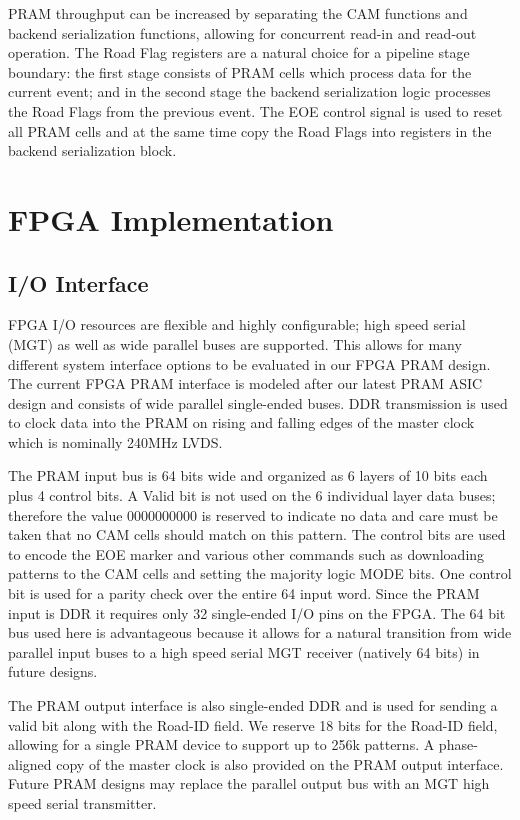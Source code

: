 \documentclass[letterpaper]{article}
\begin{document}
PRAM throughput can be increased by separating the CAM functions and backend serialization functions, allowing for concurrent read-in and read-out operation. The Road Flag registers are a natural choice for a pipeline stage boundary: the first stage consists of PRAM cells which process data for the current event; and in the second stage the backend serialization logic processes the Road Flags from the previous event. The EOE control signal is used to reset all PRAM cells and at the same time copy the Road Flags into registers in the backend serialization block.

\section{FPGA Implementation}

\subsection{I/O Interface}

FPGA I/O resources are flexible and highly configurable; high speed serial (MGT) as well as wide parallel buses are supported. This allows for many different system interface options to be evaluated in our FPGA PRAM design. The current FPGA PRAM interface is modeled after our latest PRAM ASIC design and consists of wide parallel single-ended buses. DDR transmission is used to clock data into the PRAM on rising and falling edges of the master clock which is nominally 240MHz LVDS.

The PRAM input bus is 64 bits wide and organized as 6 layers of 10 bits each plus 4 control bits. A Valid bit is not used on the 6 individual layer data buses; therefore the value 0000000000 is reserved to indicate no data and care must be taken that no CAM cells should match on this pattern. The control bits are used to encode the EOE marker and various other commands such as downloading patterns to the CAM cells and setting the majority logic MODE bits. One control bit is used for a parity check over the entire 64 input word. Since the PRAM input is DDR it requires only 32 single-ended I/O pins on the FPGA. The 64 bit bus used here is advantageous because it allows for a natural transition from wide parallel input buses to a high speed serial MGT receiver (natively 64 bits) in future designs.

The PRAM output interface is also single-ended DDR and is used for sending a valid bit along with the Road-ID field. We reserve 18 bits for the Road-ID field, allowing for a single PRAM device to support up to 256k patterns. A phase-aligned copy of the master clock is also provided on the PRAM output interface. Future PRAM designs may replace the parallel output bus with an MGT high speed serial transmitter.
\end{document}

